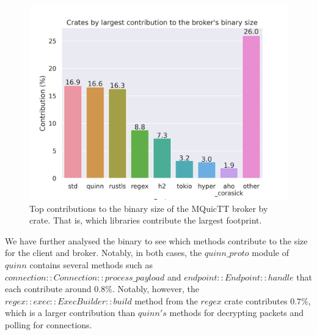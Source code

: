 \begin{figure}[ht]
    \centering
    \includegraphics[width=1\linewidth]{images/mquictt_binary_broker.png}
    \caption{Top contributions to the binary size of the MQuicTT broker by crate. That is, which libraries contribute the largest footprint.}
    \label{fig:mquictt_broker_bin}
\end{figure}

We have further analysed the binary to see which methods contribute to the size for the client and broker.
Notably, in both cases, the $quinn\_proto$ module of $quinn$ contains several methods such as $connection::Connection::process\_payload$ and $endpoint::Endpoint::handle$ that each contribute around $0.8\%$.
Notably, however, the $regex::exec::ExecBuilder::build$ method from the $regex$ crate contributes $0.7\%$, which is a larger contribution than $quinn's$ methods for decrypting packets and polling for connections.


